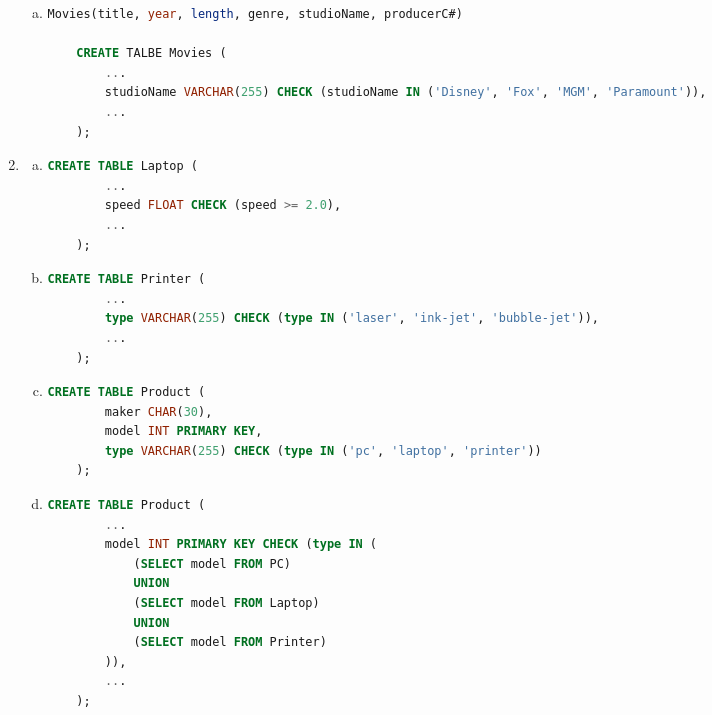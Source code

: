 \documentclass[12pt]{article}
\begin{document}
\begin{enumerate}[1.]
\begin{enumerate}[a)]
        \item

    \begin{lstlisting}[language=SQL]
    Movies(title, year, length, genre, studioName, producerC#)

    CREATE TALBE Movies (
        ...
        studioName VARCHAR(255) CHECK (studioName IN ('Disney', 'Fox', 'MGM', 'Paramount')),
        ...
    );
    \end{lstlisting}

    \end{enumerate}

    \item

    \begin{enumerate}[a)]
        \item

    \begin{lstlisting}[language=SQL]
    CREATE TABLE Laptop (
        ...
        speed FLOAT CHECK (speed >= 2.0),
        ...
    );
    \end{lstlisting}

        \item

    \begin{lstlisting}[language=SQL]
    CREATE TABLE Printer (
        ...
        type VARCHAR(255) CHECK (type IN ('laser', 'ink-jet', 'bubble-jet')),
        ...
    );
    \end{lstlisting}

        \item

    \begin{lstlisting}[language=SQL]
    CREATE TABLE Product (
        maker CHAR(30),
        model INT PRIMARY KEY,
        type VARCHAR(255) CHECK (type IN ('pc', 'laptop', 'printer'))
    );
    \end{lstlisting}

        \item

    \begin{lstlisting}[language=SQL]
    CREATE TABLE Product (
        ...
        model INT PRIMARY KEY CHECK (type IN (
            (SELECT model FROM PC)
            UNION
            (SELECT model FROM Laptop)
            UNION
            (SELECT model FROM Printer)
        )),
        ...
    );
    \end{lstlisting}

    \end{enumerate}


\end{enumerate}
\end{document}
